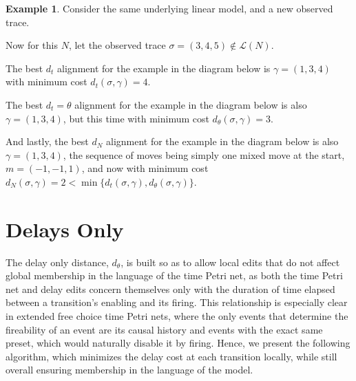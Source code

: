 \documentclass{article}
\theoremstyle{Definition}
\theoremstyle{definition}
\newtheorem{example}{Example}
\begin{document}
	
\begin{example}\label{mixedmoveex}
	Consider the same underlying linear model, and a new observed trace. 
	
	
	Now for this $N$, let the observed trace $\sigma = (3, 4, 5) \not \in \mathcal{L}(N)$. 
	
	The best $d_t$ alignment for the example in the diagram below is $\gamma = (1,3,4)$ with minimum cost $d_t(\sigma, \gamma) = 4$. 
	
	The best $d_t=\theta$ alignment for the example in the diagram below is also $\gamma = (1,3,4)$, but this time with minimum cost $d_\theta(\sigma, \gamma) = 3$. 
		
	And lastly, the best $d_N$ alignment for the example in the diagram below is also $\gamma = (1,3,4)$, the sequence of moves being simply one mixed move at the start, $m = (-1, -1, 1)$, and now with minimum cost $d_N(\sigma, \gamma) = 2 < \min \{d_t(\sigma, \gamma), d_\theta(\sigma, \gamma)\}$. 
\end{example}

	\section{Delays Only }

	The delay only distance, $d_\theta$, is built so as to allow local edits that do not affect global membership in the language of the time Petri net, as both the time Petri net and delay edits concern themselves only with the duration of time elapsed between a transition's enabling and its firing. 
	This relationship is especially clear in extended free choice time Petri nets, where the only events that determine the fireability of an event are its causal history and events with the exact same preset, which would naturally disable it by firing. 
	Hence, we present the following algorithm, which minimizes the delay cost at each transition locally, while still overall ensuring membership in the language of the model. 
	
\end{document}
